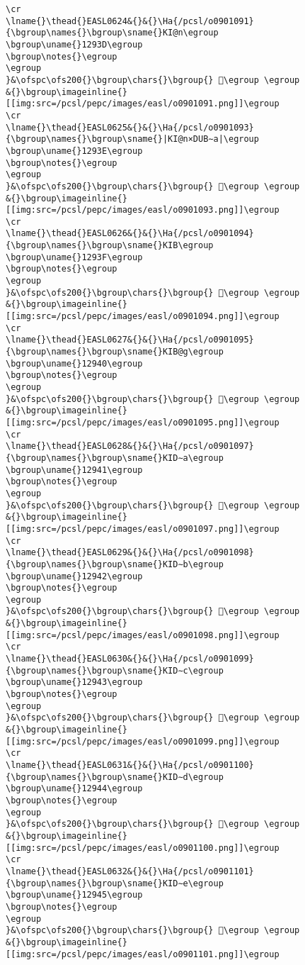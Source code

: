 \begin{verbatim}
\cr
\lname{}\thead{}EASL0624&{}&{}\Ha{/pcsl/o0901091}{\bgroup\names{}\bgroup\sname{}KI@n\egroup
\bgroup\uname{}1293D\egroup
\bgroup\notes{}\egroup
\egroup
}&\ofspc\ofs200{}\bgroup\chars{}\bgroup{} 𒤽\egroup \egroup
&{}\bgroup\imageinline{}[[img:src=/pcsl/pepc/images/easl/o0901091.png]]\egroup
\cr
\lname{}\thead{}EASL0625&{}&{}\Ha{/pcsl/o0901093}{\bgroup\names{}\bgroup\sname{}|KI@n×DUB∼a|\egroup
\bgroup\uname{}1293E\egroup
\bgroup\notes{}\egroup
\egroup
}&\ofspc\ofs200{}\bgroup\chars{}\bgroup{} 𒤾\egroup \egroup
&{}\bgroup\imageinline{}[[img:src=/pcsl/pepc/images/easl/o0901093.png]]\egroup
\cr
\lname{}\thead{}EASL0626&{}&{}\Ha{/pcsl/o0901094}{\bgroup\names{}\bgroup\sname{}KIB\egroup
\bgroup\uname{}1293F\egroup
\bgroup\notes{}\egroup
\egroup
}&\ofspc\ofs200{}\bgroup\chars{}\bgroup{} 𒤿\egroup \egroup
&{}\bgroup\imageinline{}[[img:src=/pcsl/pepc/images/easl/o0901094.png]]\egroup
\cr
\lname{}\thead{}EASL0627&{}&{}\Ha{/pcsl/o0901095}{\bgroup\names{}\bgroup\sname{}KIB@g\egroup
\bgroup\uname{}12940\egroup
\bgroup\notes{}\egroup
\egroup
}&\ofspc\ofs200{}\bgroup\chars{}\bgroup{} 𒥀\egroup \egroup
&{}\bgroup\imageinline{}[[img:src=/pcsl/pepc/images/easl/o0901095.png]]\egroup
\cr
\lname{}\thead{}EASL0628&{}&{}\Ha{/pcsl/o0901097}{\bgroup\names{}\bgroup\sname{}KID∼a\egroup
\bgroup\uname{}12941\egroup
\bgroup\notes{}\egroup
\egroup
}&\ofspc\ofs200{}\bgroup\chars{}\bgroup{} 𒥁\egroup \egroup
&{}\bgroup\imageinline{}[[img:src=/pcsl/pepc/images/easl/o0901097.png]]\egroup
\cr
\lname{}\thead{}EASL0629&{}&{}\Ha{/pcsl/o0901098}{\bgroup\names{}\bgroup\sname{}KID∼b\egroup
\bgroup\uname{}12942\egroup
\bgroup\notes{}\egroup
\egroup
}&\ofspc\ofs200{}\bgroup\chars{}\bgroup{} 𒥂\egroup \egroup
&{}\bgroup\imageinline{}[[img:src=/pcsl/pepc/images/easl/o0901098.png]]\egroup
\cr
\lname{}\thead{}EASL0630&{}&{}\Ha{/pcsl/o0901099}{\bgroup\names{}\bgroup\sname{}KID∼c\egroup
\bgroup\uname{}12943\egroup
\bgroup\notes{}\egroup
\egroup
}&\ofspc\ofs200{}\bgroup\chars{}\bgroup{} 𒥃\egroup \egroup
&{}\bgroup\imageinline{}[[img:src=/pcsl/pepc/images/easl/o0901099.png]]\egroup
\cr
\lname{}\thead{}EASL0631&{}&{}\Ha{/pcsl/o0901100}{\bgroup\names{}\bgroup\sname{}KID∼d\egroup
\bgroup\uname{}12944\egroup
\bgroup\notes{}\egroup
\egroup
}&\ofspc\ofs200{}\bgroup\chars{}\bgroup{} 𒥄\egroup \egroup
&{}\bgroup\imageinline{}[[img:src=/pcsl/pepc/images/easl/o0901100.png]]\egroup
\cr
\lname{}\thead{}EASL0632&{}&{}\Ha{/pcsl/o0901101}{\bgroup\names{}\bgroup\sname{}KID∼e\egroup
\bgroup\uname{}12945\egroup
\bgroup\notes{}\egroup
\egroup
}&\ofspc\ofs200{}\bgroup\chars{}\bgroup{} 𒥅\egroup \egroup
&{}\bgroup\imageinline{}[[img:src=/pcsl/pepc/images/easl/o0901101.png]]\egroup

\end{verbatim}
